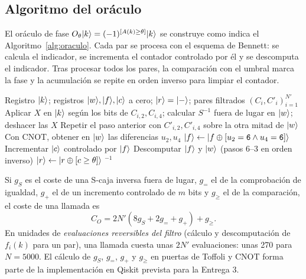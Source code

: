 \subsection{Algoritmo del oráculo}

El oráculo de fase \(O_\theta\lvert k\rangle=(-1)^{[A(k)\ge\theta]}\lvert k\rangle\) se construye como indica el Algoritmo~\ref{alg:oraculo}. Cada par se procesa con el esquema de Bennett: se calcula el indicador, se incrementa el contador controlado por él y se descomputa el indicador. Tras procesar todos los pares, la comparación con el umbral marca la fase y la acumulación se repite en orden inverso para limpiar el contador.

\begin{algorithm}[H]
\caption{Oráculo reversible de puntuación \(O_\theta\)}
\label{alg:oraculo}
\begin{algorithmic}[1]
\Require Registro \(\lvert k\rangle\); registros \(\lvert w\rangle,\lvert f\rangle,\lvert c\rangle\) a cero; \(\lvert r\rangle=\lvert -\rangle\); pares filtrados \((C_i,C'_i)_{i=1}^{N'}\)
  \State Aplicar \(X\) en \(\lvert k\rangle\) según los bits de \(C_{i,2},C_{i,4}\); calcular \(S^{-1}\) fuera de lugar en \(\lvert w\rangle\); deshacer las \(X\)
  \State Repetir el paso anterior con \(C'_{i,2},C'_{i,4}\) sobre la otra mitad de \(\lvert w\rangle\)
  \State Con CNOT, obtener en \(\lvert w\rangle\) las diferencias \(u_2,u_4\)
  \State \(\lvert f\rangle\gets\lvert f\oplus[u_2=\texttt{6}\wedge u_4=\texttt{6}]\rangle\) 
  \State Incrementar \(\lvert c\rangle\) controlado por \(\lvert f\rangle\)
  \State Descomputar \(\lvert f\rangle\) y \(\lvert w\rangle\) (pasos 6--3 en orden inverso)
 \EndFor
\EndProcedure
\State {}
\State \(\lvert r\rangle\gets\lvert r\oplus[c\ge\theta]\rangle\) 
\State {}\(^{-1}\) 
\end{algorithmic}
\end{algorithm}

Si \(g_S\) es el coste de una S-caja inversa fuera de lugar, \(g_{=}\) el de la comprobación de igualdad, \(g_{+}\) el de un incremento controlado de \(m\) bits y \(g_{\ge}\) el de la comparación, el coste de una llamada es
\begin{equation}
 C_{O}=2N'\left(8g_S+2g_{=}+g_{+}\right)+g_{\ge}.
 \label{eq:coste-oraculo}
\end{equation}
En unidades de \emph{evaluaciones reversibles del filtro} (cálculo y descomputación de \(f_i(k)\) para un par), una llamada cuesta unas \(2N'\) evaluaciones: unas 270 para \(N=5000\). El cálculo de \(g_S\), \(g_{=}\), \(g_{+}\) y \(g_{\ge}\) en puertas de Toffoli y CNOT forma parte de la implementación en Qiskit prevista para la Entrega 3.

